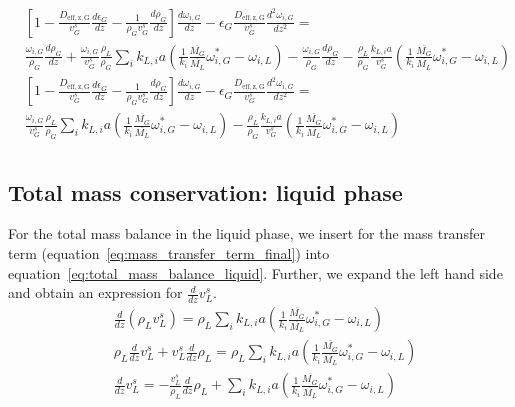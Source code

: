 \documentclass{article}
\begin{document}
\begin{equation}
	\begin{split}
		&\left[1 - \frac{D_{\mathrm{eff,z,G}}}{v_G^s}\frac{d \epsilon_G}{dz} -\frac{1}{\rho_Gv_G^s}\frac{d\rho_G}{dz}\right]\frac{d\omega_{i,G}}{dz} - \epsilon_G \frac{D_{\mathrm{eff,z,G}}}{v_G^s}\frac{d^2\omega_{i,G}}{dz^2} = \\
		& \frac{\omega_{i,G}}{\rho_G}\frac{d \rho_G}{dz} + \frac{\omega_{i,G}}{v_G^s}\frac{\rho_L}{\rho_G}\sum_ik_{L,i}a(\frac{1}{k_i}\frac{\overline{M_G}}{\overline{M_L}}\omega_{i,G}^*-\omega_{i,L}) - \frac{\omega_{i,G}}{\rho_G}\frac{d \rho_G}{dz} - \frac{\rho_L}{\rho_G}\frac{k_{L,i}a}{v_G^s}(\frac{1}{k_i}\frac{\overline{M_G}}{\overline{M_L}}\omega_{i,G}^*-\omega_{i,L})\\
		&\left[1 - \frac{D_{\mathrm{eff,z,G}}}{v_G^s}\frac{d \epsilon_G}{dz} -\frac{1}{\rho_Gv_G^s}\frac{d\rho_G}{dz}\right]\frac{d\omega_{i,G}}{dz} - \epsilon_G \frac{D_{\mathrm{eff,z,G}}}{v_G^s}\frac{d^2\omega_{i,G}}{dz^2} = \\
		&\frac{\omega_{i,G}}{v_G^s}\frac{\rho_L}{\rho_G}\sum_ik_{L,i}a(\frac{1}{k_i}\frac{\overline{M_G}}{\overline{M_L}}\omega_{i,G}^*-\omega_{i,L})  - \frac{\rho_L}{\rho_G}\frac{k_{L,i}a}{v_G^s}(\frac{1}{k_i}\frac{\overline{M_G}}{\overline{M_L}}\omega_{i,G}^*-\omega_{i,L})\\
			\label{eq:component_balance_gas_manipulations}
	\end{split}
\end{equation}

\subsection{Total mass conservation: liquid phase}

For the total mass balance in the liquid phase, we insert for the mass transfer term (equation~\ref{eq:mass_transfer_term_final}) into equation~\ref{eq:total_mass_balance_liquid}. Further, we expand the left hand side and obtain an expression for $\frac{d}{dz}v_L^s$.
\begin{equation}
	\begin{split}
	&\frac{d}{dz}\left(\rho_Lv_L^s\right) =\rho_L\sum_ik_{L,i}a(\frac{1}{k_i}\frac{\overline{M_G}}{\overline{M_L}}\omega_{i,G}^*-\omega_{i,L}) \\
	&\rho_L\frac{d}{dz}v_L^s + v_L^s\frac{d}{dz}\rho_L = \rho_L\sum_ik_{L,i}a(\frac{1}{k_i}\frac{\overline{M_G}}{\overline{M_L}}\omega_{i,G}^*-\omega_{i,L}) \\
	&\frac{d}{dz}v_L^s = -\frac{v_L^s}{\rho_L}\frac{d}{dz}\rho_L + \sum_ik_{L,i}a(\frac{1}{k_i}\frac{\overline{M_G}}{\overline{M_L}}\omega_{i,G}^*-\omega_{i,L})
	\label{eq:total_mass_balance_liquid_manipulations}
	\end{split}
\end{equation}
\end{document}
